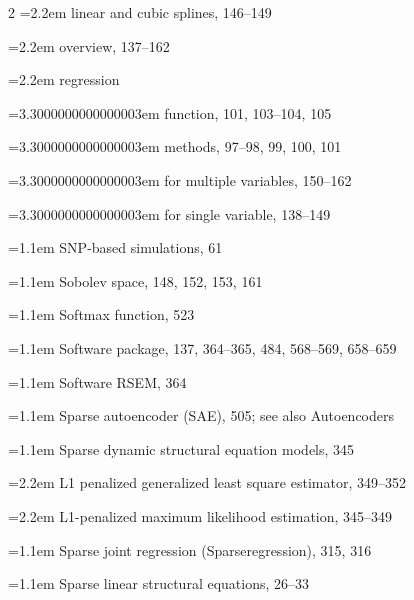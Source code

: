 \begin{multicols}{2}
\noindent\hangindent=2.2em \hspace*{1.1em}linear and cubic splines, 146--149\par
\noindent\hangindent=2.2em \hspace*{1.1em}overview, 137--162\par
\noindent\hangindent=2.2em \hspace*{1.1em}regression\par
\noindent\hangindent=3.3000000000000003em \hspace*{2.2em}function, 101, 103--104, 105\par
\noindent\hangindent=3.3000000000000003em \hspace*{2.2em}methods, 97--98, 99, 100, 101\par
\noindent\hangindent=3.3000000000000003em \hspace*{2.2em}for multiple variables, 150--162\par
\noindent\hangindent=3.3000000000000003em \hspace*{2.2em}for single variable, 138--149\par
\noindent\hangindent=1.1em SNP-based simulations, 61\par
\noindent\hangindent=1.1em Sobolev space, 148, 152, 153, 161\par
\noindent\hangindent=1.1em Softmax function, 523\par
\noindent\hangindent=1.1em Software package, 137, 364--365, 484, 568--569, 658--659\par
\noindent\hangindent=1.1em Software RSEM, 364\par
\noindent\hangindent=1.1em Sparse autoencoder (SAE), 505; see also Autoencoders\par
\noindent\hangindent=1.1em Sparse dynamic structural equation models, 345\par
\noindent\hangindent=2.2em \hspace*{1.1em}L1 penalized generalized least square estimator, 349--352\par
\noindent\hangindent=2.2em \hspace*{1.1em}L1-penalized maximum likelihood estimation, 345--349\par
\noindent\hangindent=1.1em Sparse joint regression (Sparseregression), 315, 316\par
\noindent\hangindent=1.1em Sparse linear structural equations, 26--33\par

\end{multicols}
